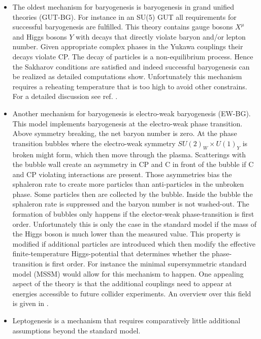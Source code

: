 \documentclass[13pt,a4paper,titlepage]{article}
\begin{document}
\begin{itemize}
    \item The oldest mechanism for baryogenesis is baryogenesis in grand unified theories (GUT-BG).
    For instance in an SU(5) GUT all requirements for successful baryogenesis are
    fulfilled. This theory contains gauge bosons $X^\mu$ and Higgs bosons $Y$ with decays that directly
    violate baryon and/or lepton number. Given appropriate complex phases in the Yukawa couplings
    their decays violate CP. The decay of particles is a non-equilibrium process. Hence the Sakharov conditions are satisfied and indeed successful baryogenesis can be realized as detailed computations show.
    Unfortunately this mechanism requires a reheating temperature that is too high to avoid other constrains. For a detailed discussion see ref. \cite[sec. 3]{Dine_2003_Bayrogenesis}.
    \item Another mechanism for baryogenesis is electro-weak baryogenesis (EW-BG).
    This model implements baryogenesis at the electro-weak phase transition.
    Above symmetry breaking, the net baryon number is zero.
    At the phase transition bubbles where the electro-weak symmetry $SU(2)_W \times U(1)_Y$ is broken might form, which then
    move through the plasma.
    Scatterings with the bubble wall create an asymmetry in CP and C in front of the bubble if C and CP violating interactions are present.
    Those asymmetries bias the sphaleron rate to create more particles than anti-particles in the unbroken phase.
    Some particles then are collected by the bubble. Inside the bubble the sphaleron rate is suppressed and the
    baryon number is not washed-out.
    The formation of bubbles only happens if the elector-weak phase-transition is first order.
    Unfortunately this is only the case in the standard model if the mass of the Higgs boson is much lower than
    the measured value.
    This property is modified if additional particles are introduced which then modify the effective finite-temperature
    Higgs-potential that determines whether the phase-transition is first order.
    For instance the minimal supersymmetric standard model (MSSM) would allow for this mechanism to happen.
    One appealing aspect of the theory is that the additional couplings need to appear at energies accessible to future collider
    experiments. An overview over this field is given in \cite{Electroweak_baryogenesis_Morrissey_2012}.
    \item Leptogenesis is a mechanism that requires comparatively little additional assumptions beyond the standard model.

\end{itemize}
\end{document}
